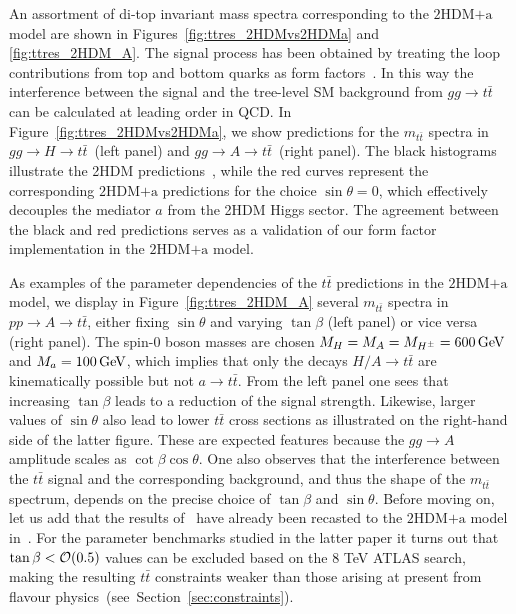 \documentclass[a4paper, 11pt,notoc]{article}
\newcommand{\mA}{\ensuremath{M_{A}}\xspace}
\newcommand{\ma}{\ensuremath{M_{a}}\xspace}
\newcommand{\mH}{\ensuremath{M_{H}}\xspace}
\newcommand{\mHc}{\ensuremath{M_{H^{\pm}}}\xspace}
\newcommand{\hdma}{\ensuremath{\textrm{2HDM+a}}\xspace}
\begin{document}
An assortment of di-top invariant mass spectra corresponding to the \hdma model are shown in Figures~\ref{fig:ttres_2HDMvs2HDMa} and \ref{fig:ttres_2HDM_A}. The signal process has been obtained by treating the loop contributions from top and bottom quarks as form factors~\cite{FranzosiZhang}. In this way the interference between the signal and the tree-level SM background from $gg \to t \bar t$ can be calculated at leading order in QCD. In Figure~\ref{fig:ttres_2HDMvs2HDMa}, we show predictions for the $m_{t \bar t}$ spectra in $gg \to H \to t \bar t$~(left panel) and $gg \to A \to t \bar t$~(right panel). The black histograms illustrate the 2HDM predictions~\cite{Aaboud:2017hnm}, while the red curves represent the corresponding \hdma predictions for the choice $\sin \theta = 0$, which effectively decouples the mediator $a$ from the 2HDM Higgs sector. The agreement between the black and red predictions serves as a validation of our form factor implementation in the \hdma model. 

As examples of the parameter dependencies of the $t \bar t$ predictions in the \hdma model, we display in  Figure~\ref{fig:ttres_2HDM_A} several $m_{t \bar t}$ spectra in $pp \to A \to t \bar t$, either fixing $\sin \theta$ and varying $\tan \beta$ (left panel) or vice versa (right panel). The  spin-0 boson  masses are chosen $\mH=\mA=\mHc =600 \, {\rm GeV}$ and $\ma=100 \, {\rm GeV}$, which implies that only the  decays $H/A \to t \bar t$  are kinematically possible but not $a \to t \bar t$.  From the left panel one sees that increasing $\tan \beta$ leads  to a reduction of the signal strength.  Likewise, larger values of $\sin \theta$ also lead to lower $t \bar t$ cross sections as illustrated on the right-hand side of the latter figure. These are expected features because the $g g \to A$ amplitude  scales as $\cot \beta \cos \theta$.  One also observes that the interference between the $t \bar t$ signal and the corresponding background, and thus the shape of the $m_{t \bar t}$ spectrum, depends on the precise choice of $\tan \beta$  and $\sin \theta$.  Before moving on, let us add that the results of~\cite{Aaboud:2017hnm} have already been recasted to the \hdma model in~\cite{Bauer:2017ota}. For the parameter benchmarks studied in the latter paper it turns out that $\tan \beta < {\cal O} ( 0.5)$ values can be excluded based on the 8 TeV ATLAS search, making the resulting $t \bar t$ constraints weaker than those arising at present from flavour physics~(see~Section~\ref{sec:constraints}). 
\end{document}

